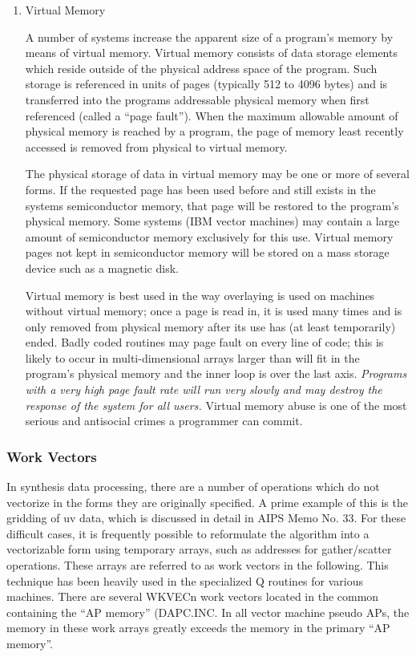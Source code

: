 \begin{enumerate}
\item Virtual Memory

A number of systems increase the apparent size of a program's memory
by means of virtual memory.  Virtual memory consists of data storage
elements which reside outside of the physical address space of the
program.  Such storage is referenced in units of pages (typically 512
to 4096 bytes) and is transferred into the programs addressable
physical memory when first referenced (called a ``page fault''). When
the maximum allowable amount of physical memory is reached by a
program, the page of memory least recently accessed is removed from
physical to virtual memory.

The physical storage of data in virtual memory may be one or more of
several forms.  If the requested page has been used before and still
exists in the systems semiconductor memory, that page will be restored
to the program's physical memory.  Some systems (IBM vector machines)
may contain a large amount of semiconductor memory exclusively for
this use.  Virtual memory pages not kept in semiconductor memory will
be stored on a mass storage device such as a magnetic disk.

Virtual memory is best used in the way overlaying is used on machines
without virtual memory; once a page is read in, it is used many times
and is only removed from physical memory after its use has (at least
temporarily) ended. Badly coded routines may page fault on every line
of code; this is likely to occur in multi-dimensional arrays larger
than will fit in the program's physical memory and the inner loop is
over the last axis.  {\it Programs with a very high page fault rate will
run very slowly and may destroy the response of the system for all
users.} Virtual memory abuse is one of the most serious and
antisocial crimes a programmer can commit.

\end{enumerate} %
\subsubsection{Work Vectors }
In synthesis data processing, there are a number of operations which
do not vectorize in the forms they are originally specified.  A prime
example of this is the gridding of uv data, which is discussed in
detail in AIPS Memo No. 33.  For these difficult cases, it is
frequently possible to reformulate the algorithm into a vectorizable
form using temporary arrays, such as addresses for gather/scatter
operations.  These arrays are referred to as work vectors in the
following.  This technique has been heavily used in the specialized Q
routines for various machines.  There are several WKVECn work vectors
located in the common containing the ``AP memory''
(DAPC.INC.  In all vector
machine pseudo APs, the memory in these work arrays greatly exceeds
the memory in the primary ``AP memory''.

